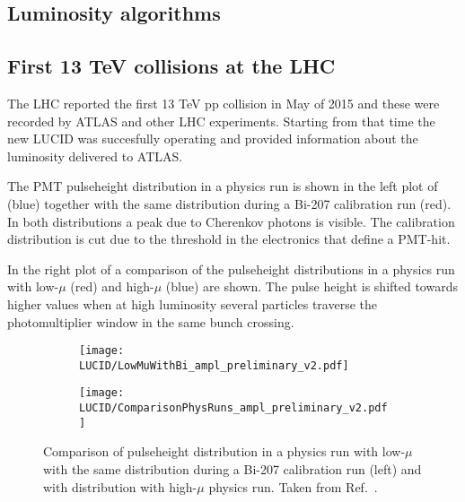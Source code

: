 \subsection{Luminosity algorithms}



\subsection{First 13 TeV collisions at the LHC}
\label{sec:physics}

The LHC reported the first 13 TeV pp collision in May of 2015 and these were recorded by ATLAS and other LHC 
experiments. 
Starting from that time the new LUCID was succesfully operating and provided information about the 
luminosity delivered to ATLAS. 

The PMT pulseheight distribution in a physics run is shown in the left plot of  (blue) 
together with the same distribution 
during a Bi-207 calibration run (red). In both distributions a peak due to Cherenkov photons is visible. The 
calibration distribution is cut due to the threshold in the electronics that define a PMT-hit.

In the right plot of  a comparison of the pulseheight distributions in a physics run 
with
low-$\mu$ (red) and high-$\mu$ (blue) are shown. The pulse height is shifted towards higher values when at high 
luminosity several particles traverse the photomultiplier window in the same bunch crossing.

\begin{figure}
\centering
\begin{subfigure}{.5\textwidth}
  \centering
  \texttt{[image: LUCID/LowMuWithBi\_ampl\_preliminary\_v2.pdf]}
  \label{fig:sub1}
\end{subfigure}%
\begin{subfigure}{.5\textwidth}
  \centering
  \texttt{[image: LUCID/ComparisonPhysRuns\_ampl\_preliminary\_v2.pdf]}
  \label{fig:sub2}
\end{subfigure}
\caption{Comparison of pulseheight distribution in a physics run with low-$\mu$ with the same distribution 
during a Bi-207 calibration run (left) and with distribution with high-$\mu$ physics run. Taken from Ref.~\cite{publicPlots}.}
\label{fig:Pulseheight}
\end{figure}

